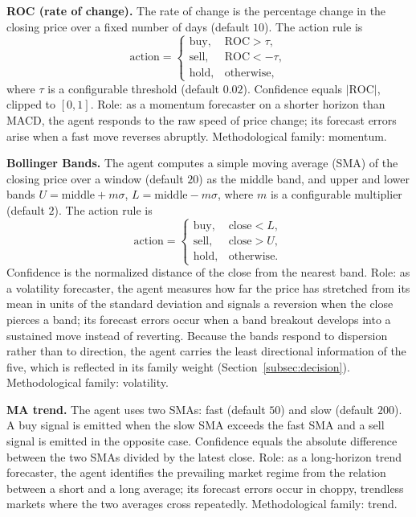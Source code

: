 \documentclass{ieeeaccess}
\begin{document}
\textbf{ROC (rate of change).} The rate of change is the percentage change in the closing price over a fixed number of days (default $10$). The action rule is
\begin{equation}
\mathrm{action} =
\begin{cases}
\mathrm{buy}, & \mathrm{ROC} > \tau, \\
\mathrm{sell}, & \mathrm{ROC} < -\tau, \\
\mathrm{hold}, & \mathrm{otherwise},
\end{cases}
\end{equation}
where $\tau$ is a configurable threshold (default $0.02$). Confidence equals $|\mathrm{ROC}|$, clipped to $[0, 1]$. Role: as a momentum forecaster on a shorter horizon than MACD, the agent responds to the raw speed of price change; its forecast errors arise when a fast move reverses abruptly. Methodological family: momentum.

\textbf{Bollinger Bands.} The agent computes a simple moving average (SMA) of the closing price over a window (default $20$) as the middle band, and upper and lower bands $U = \mathrm{middle} + m\sigma$, $L = \mathrm{middle} - m\sigma$, where $m$ is a configurable multiplier (default $2$). The action rule is
\begin{equation}
\mathrm{action} =
\begin{cases}
\mathrm{buy}, & \mathrm{close} < L, \\
\mathrm{sell}, & \mathrm{close} > U, \\
\mathrm{hold}, & \mathrm{otherwise}.
\end{cases}
\end{equation}
Confidence is the normalized distance of the close from the nearest band. Role: as a volatility forecaster, the agent measures how far the price has stretched from its mean in units of the standard deviation and signals a reversion when the close pierces a band; its forecast errors occur when a band breakout develops into a sustained move instead of reverting. Because the bands respond to dispersion rather than to direction, the agent carries the least directional information of the five, which is reflected in its family weight (Section~\ref{subsec:decision}). Methodological family: volatility.

\textbf{MA trend.} The agent uses two SMAs: fast (default $50$) and slow (default $200$). A buy signal is emitted when the slow SMA exceeds the fast SMA and a sell signal is emitted in the opposite case. Confidence equals the absolute difference between the two SMAs divided by the latest close. Role: as a long-horizon trend forecaster, the agent identifies the prevailing market regime from the relation between a short and a long average; its forecast errors occur in choppy, trendless markets where the two averages cross repeatedly. Methodological family: trend.
\end{document}
